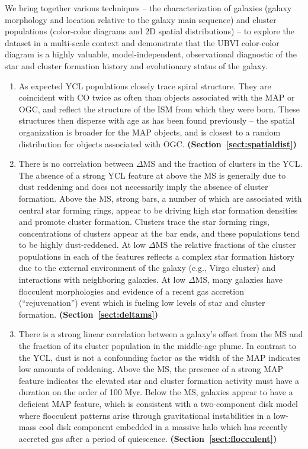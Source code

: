 \documentclass[linenumbers]{aastex63}
\begin{document}
We bring together various techniques -- the characterization of galaxies (galaxy morphology and location relative to the galaxy main sequence) and cluster populations (color-color diagrams and 2D spatial distributions) -- to explore the dataset in a multi-scale context and demonstrate that the UBVI color-color diagram is a highly valuable, model-independent, observational diagnostic of the star and cluster formation history and evolutionary status of the galaxy.
\begin{enumerate}
\item As expected YCL populations closely trace spiral structure.  They are coincident with CO twice as often than objects associated with the MAP or OGC, and reflect the structure of the ISM from which they were born. These structures then disperse with age as has been found previously -- the spatial organization is broader for the MAP objects, and is closest to a random distribution for objects associated with OGC.  \textbf{(Section~\ref{sect:spatialdist})}

\item There is no correlation between $\Delta$MS and the fraction of clusters in the YCL. The absence of a strong YCL feature at above the MS is generally due to dust reddening and does not necessarily imply the absence of cluster formation.  Above the MS, strong bars, a number of which are associated with central star forming rings, appear to be driving high star formation densities and promote cluster formation. Clusters trace the star forming rings, concentrations of clusters appear at the bar ends, and these populations tend to be highly dust-reddened.  At low $\Delta$MS the relative fractions of the cluster populations in each of the features reflects a complex star formation history due to the external environment of the galaxy (e.g., Virgo cluster) and interactions with neighboring galaxies.  At low $\Delta$MS, many galaxies have flocculent morphologies and evidence of a recent gas accretion (``rejuvenation'') event which is fueling low levels of star and cluster formation.  \textbf{(Section~\ref{sect:deltams})}
\item  There is a strong linear correlation between a galaxy's offset from the MS and the fraction of its cluster population in the middle-age plume.  In contrast to the YCL, dust is not a confounding factor as the width of the MAP indicates low amounts of reddening.  Above the MS, the presence of a strong MAP feature indicates the elevated star and cluster formation activity must have a duration on the order of 100 Myr.  Below the MS, galaxies appear to have a deficient MAP feature, which is consistent with a two-component disk model where flocculent patterns arise through gravitational instabilities in a low-mass cool disk component embedded in
a massive halo which has recently accreted gas after a period of quiescence.    \textbf{(Section~\ref{sect:flocculent})}



\end{enumerate}
\end{document}
